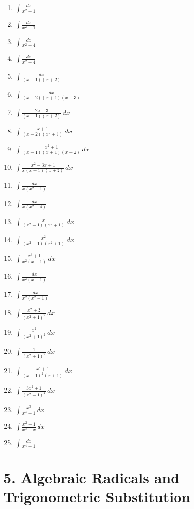 \documentclass[11pt]{article}
\begin{document}
\begin{enumerate}
\item $\displaystyle \int \frac{dx}{x^2-1}$
\item $\displaystyle \int \frac{dx}{x^2+1}$
\item $\displaystyle \int \frac{dx}{x^2-4}$
\item $\displaystyle \int \frac{dx}{x^2+4}$
\item $\displaystyle \int \frac{dx}{(x-1)(x+2)}$
\item $\displaystyle \int \frac{dx}{(x-2)(x+1)(x+3)}$
\item $\displaystyle \int \frac{2x+3}{(x-1)(x+2)}\,dx$
\item $\displaystyle \int \frac{x+1}{(x-2)(x^2+1)}\,dx$
\item $\displaystyle \int \frac{x^2+1}{(x-1)(x+1)(x+2)}\,dx$
\item $\displaystyle \int \frac{x^2+3x+1}{x(x+1)(x+2)}\,dx$
\item $\displaystyle \int \frac{dx}{x(x^2+1)}$
\item $\displaystyle \int \frac{dx}{x(x^2+4)}$
\item $\displaystyle \int \frac{x}{(x^2-1)(x^2+1)}\,dx$
\item $\displaystyle \int \frac{x^2}{(x^2-1)(x^2+1)}\,dx$
\item $\displaystyle \int \frac{x^3+1}{x^2(x+1)}\,dx$
\item $\displaystyle \int \frac{dx}{x^2(x+1)}$
\item $\displaystyle \int \frac{dx}{x^2(x^2+1)}$
\item $\displaystyle \int \frac{x^2+2}{(x^2+1)^2}\,dx$
\item $\displaystyle \int \frac{x^2}{(x^2+1)^2}\,dx$
\item $\displaystyle \int \frac{1}{(x^2+1)^2}\,dx$
\item $\displaystyle \int \frac{x^2+1}{(x-1)^2(x+1)}\,dx$
\item $\displaystyle \int \frac{3x^2+1}{(x^2-1)^2}\,dx$
\item $\displaystyle \int \frac{x^3}{x^4-1}\,dx$
\item $\displaystyle \int \frac{x^2+1}{x^3-x}\,dx$
\item $\displaystyle \int \frac{dx}{x^4+1}$
\end{enumerate}

\section*{5. Algebraic Radicals and Trigonometric Substitution}
\end{document}
